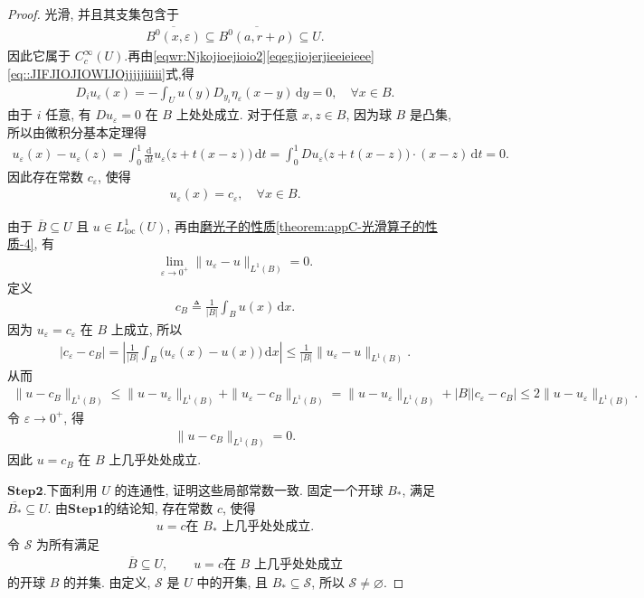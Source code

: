 \documentclass[../../main.tex]{subfiles}
\begin{document}
\begin{proof}
光滑, 并且其支集包含于
\begin{align*}
\overline{B^{0}(x,\varepsilon)}
\subseteq\overline{B^{0}(a,r+\rho)}
\subseteq U.
\end{align*}
因此它属于 $C_c^\infty(U)$.再由\eqref{eqwr:Njkojioejioio2}\eqref{eqegjiojerjieeieieee}\eqref{eq::JIFJIOJIOWIJOjjjjjiiiii}式,得
\begin{align*}
D_i u_\varepsilon(x)
=-\int_Uu(y)D_{y_i}\eta_\varepsilon(x-y)\,\mathrm{d}y
=0,\quad \forall x\in B.
\end{align*}
由于 $i$ 任意, 有 $Du_\varepsilon=0$ 在 $B$ 上处处成立.
对于任意 $x,z\in B$, 因为球 $B$ 是凸集, 所以由微积分基本定理得
\begin{align*}
u_{\varepsilon}(x)-u_{\varepsilon}(z)=\int_0^1{\frac{\mathrm{d}}{\mathrm{d}t}u_{\varepsilon}\bigl( z+t(x-z) \bigr)}\,\mathrm{d}t=\int_0^1{Du_{\varepsilon}\bigl( z+t(x-z) \bigr)}\cdot (x-z)\,\mathrm{d}t=0.
\end{align*}
因此存在常数 $c_\varepsilon$, 使得
\begin{align*}
u_\varepsilon(x)=c_\varepsilon,
\quad \forall x\in B.
\end{align*}

由于 $\overline{B}\subseteq U$ 且 $u\in L^1_{\mathrm{loc}}(U)$, 再由\hyperref[theorem:appC-光滑算子的性质]{磨光子的性质\ref{theorem:appC-光滑算子的性质-4}}, 有
\begin{align*}
\lim\limits_{\varepsilon\to0^+}
\|u_\varepsilon-u\|_{L^1(B)}=0.
\end{align*}
定义
\begin{align*}
c_B\triangleq\frac{1}{|B|}\int_Bu(x)\,\mathrm{d}x.
\end{align*}
因为 $u_\varepsilon=c_\varepsilon$ 在 $B$ 上成立, 所以
\begin{align*}
|c_\varepsilon-c_B|
=\left|
\frac{1}{|B|}\int_B
\bigl(u_\varepsilon(x)-u(x)\bigr)\,\mathrm{d}x
\right|
\leqslant
\frac{1}{|B|}
\|u_\varepsilon-u\|_{L^1(B)}.
\end{align*}
从而
\begin{align*}
\|u-c_B\|_{L^1(B)}
\leqslant
\|u-u_\varepsilon\|_{L^1(B)}
+\|u_\varepsilon-c_B\|_{L^1(B)}=\|u-u_\varepsilon\|_{L^1(B)}
+|B||c_\varepsilon-c_B|
\leqslant
2\|u-u_\varepsilon\|_{L^1(B)}.
\end{align*}
令 $\varepsilon\to0^+$, 得
\begin{align*}
\|u-c_B\|_{L^1(B)}=0.
\end{align*}
因此 $u=c_B$ 在 $B$ 上几乎处处成立.

$\mathbf{Step}\mathbf{2.}$下面利用 $U$ 的连通性, 证明这些局部常数一致.
固定一个开球 $B_*$, 满足 $\overline{B_*}\subseteq U$.
由$\mathbf{Step}\mathbf{1}$的结论知, 存在常数 $c$, 使得
\begin{align*}
u=c\text{在 }B_*\text{ 上几乎处处成立}.
\end{align*}
令 $\mathcal{S}$ 为所有满足
\begin{align*}
\overline{B}\subseteq U,\qquad
u=c\text{在 }B\text{ 上几乎处处成立}
\end{align*}
的开球 $B$ 的并集.
由定义, $\mathcal{S}$ 是 $U$ 中的开集, 且
$B_*\subseteq\mathcal{S}$, 所以 $\mathcal{S}\neq\varnothing$.


\end{proof}
\end{document}
